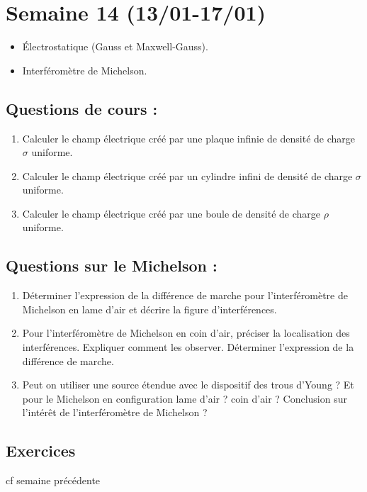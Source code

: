 \section{Semaine 14 (13/01-17/01)}


\begin{itemize}
	\item Électrostatique (Gauss et Maxwell-Gauss).
	\item Interféromètre de Michelson.
\end{itemize}

\subsection{Questions de cours :}
\begin{enumerate}
	\item Calculer le champ électrique créé par une plaque infinie de densité de charge $\sigma$ uniforme.
	\item Calculer le champ électrique créé par un cylindre infini de densité de charge $\sigma$ uniforme.
	\item Calculer le champ électrique créé par une boule de densité de charge $\rho$ uniforme.
\end{enumerate}

\subsection{Questions sur le Michelson :}
\begin{enumerate}
	\item Déterminer l'expression de la différence de marche pour l'interféromètre de Michelson en lame d'air et décrire la figure d'interférences.
	\item Pour l'interféromètre de Michelson en coin d'air, préciser la localisation des interférences. Expliquer comment les observer. Déterminer l'expression de la différence de marche.
	\item Peut on utiliser une source étendue avec le dispositif des trous d'Young ? Et pour le Michelson en configuration lame d'air ? coin d'air ? Conclusion sur l'intérêt de l'interféromètre de Michelson ?
\end{enumerate}

\subsection{Exercices}
cf semaine précédente